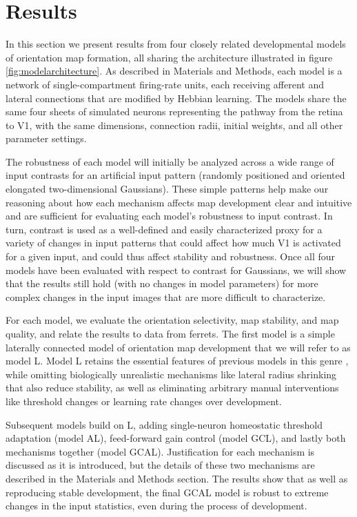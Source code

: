 \documentclass{article}
\begin{document}
\normalsize

\section*{Results}
In this section we present results from four closely related
developmental models of orientation map formation, all
sharing the architecture illustrated in figure
\ref{fig:modelarchitecture}.  As described in Materials and Methods,
each model is a network of single-compartment firing-rate units, each
receiving afferent and lateral connections that are modified by
Hebbian learning.  The models share the same four sheets 
of simulated neurons representing the pathway from the retina to
V1, with the same dimensions, connection radii, initial weights,
and all other parameter settings.

The robustness of each model will initially be analyzed across a wide
range of input contrasts for an artificial input pattern (randomly
positioned and oriented elongated two-dimensional Gaussians).  These
simple patterns help make our reasoning about how each mechanism
affects map development clear and intuitive and are sufficient for
evaluating each model's robustness to input contrast.  In turn,
contrast is used as a well-defined and easily characterized proxy for
a variety of changes in input patterns that could affect how much V1
is activated for a given input, and could thus affect stability and
robustness.  Once all four models have been evaluated with respect to
contrast for Gaussians, we will show that the results still hold (with
no changes in model parameters) for more complex changes in the input
images that are more difficult to characterize.

For each model, we evaluate the orientation selectivity, map stability,
and map quality, and relate the results to data from ferrets.
The first model is a simple laterally connected model of orientation
map development that we will refer to as model L. Model L retains the
essential features of previous models in this genre \citep{Sirosh1997,Burger1999,Burger2001,Miikkulainen2005}, while omitting biologically
unrealistic mechanisms like lateral radius shrinking that also reduce
stability, as well as eliminating arbitrary manual interventions like
threshold changes or learning rate changes over development.

Subsequent models build on L, adding single-neuron homeostatic threshold
adaptation (model AL), feed-forward gain control (model GCL), and
lastly both mechanisms together (model GCAL). Justification for each
mechanism is discussed as it is introduced, but the details of these
two mechanisms are described in the Materials and Methods section.
The results show that as well as reproducing stable development, the
final GCAL model is robust to extreme changes in the input statistics,
even during the process of development.
\end{document}
